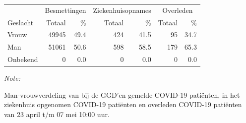 \documentclass[
  english,
  man,floatsintext]{apa6}
\begin{document}
\begin{table}
\centering\begingroup\fontsize{11}{13}\selectfont

\begin{threeparttable}
\begin{tabular}{lrrrrrr}
\toprule
\multicolumn{1}{c}{ } & \multicolumn{2}{c}{Besmettingen} & \multicolumn{2}{c}{Ziekenhuisopnames} & \multicolumn{2}{c}{Overleden} \\
\cmidrule(l{3pt}r{3pt}){2-3} \cmidrule(l{3pt}r{3pt}){4-5} \cmidrule(l{3pt}r{3pt}){6-7}
Geslacht & Totaal & \% & Totaal & \% & Totaal & \%\\
\midrule
Vrouw & 49945 & 49.4 & 424 & 41.5 & 95 & 34.7\\
Man & 51061 & 50.6 & 598 & 58.5 & 179 & 65.3\\
Onbekend & 0 & 0.0 & 0 & 0.0 & 0 & 0.0\\
\bottomrule
\end{tabular}
\begin{tablenotes}
\item \textit{Note: } 
\item Man-vrouwverdeling van bij de GGD’en gemelde COVID-19 patiënten, in het ziekenhuis opgenomen COVID-19 patiënten en overleden COVID-19 patiënten van 23 april t/m 07 mei 10:00 uur.
\end{tablenotes}
\end{threeparttable}
\endgroup{}
\end{table}
\newpage
\end{document}
